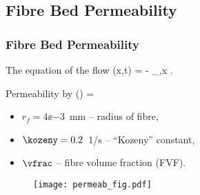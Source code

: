 \documentclass[compress]{beamer}%
\newenvironment{myalign}
{\align\color{\notcolor}}
{
  \nonumber
  \endalign
  \vspace{-1em}
}
\begin{document}
\subsection{Fibre Bed Permeability}

\begin{frame}
  \frametitle{Fibre Bed Permeability}
      The equation of the flow
      \begin{myalign}
        \flow(x,t) = - \press_{,x} .
      \end{myalign}
      
      Permeability by \citet{Dave1987b}
      \begin{myalign}
        \permeab(\vfrac) =   
      \end{myalign}
      \begin{itemize}
        \itemsep 0mm
      \item $r_f=4\ee{-3}$~mm -- radius of fibre,
      \item $\kozeny=0.2$~1/s -- ``Kozeny'' constant, 
      \item $\vfrac$ -- fibre volume fraction (FVF).
      \end{itemize}

      \begin{figure}
  \centering
  \texttt{[image: permeab\_fig.pdf]}
  \label{fig:permeab}
\end{figure}


  
\end{frame}
\end{document}
